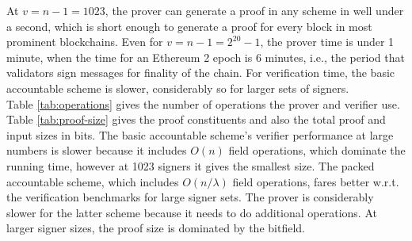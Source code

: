 \noindent At $v = n-1 = 1023$, the prover can generate a proof in any scheme in well under a second, which is short enough to generate a 
proof for every block in most prominent blockchains. Even for $v= n-1 =2^{20}-1$, the prover time is under 1 minute, 
when the time for an Ethereum 2 epoch is 6 minutes, i.e., the period that validators sign messages for finality of the chain. For verification time, 
the basic accountable scheme is slower, considerably so for larger sets of signers. \\

\noindent  Table \ref{tab:operations} gives the number of operations the prover and verifier use. Table \ref{tab:proof-size} gives the proof constituents and 
also the total proof and input sizes in bits. The basic accountable scheme's verifier performance at large numbers is slower because it includes $O(n)$ 
field operations, which dominate the running time, however at 1023 signers it gives the smallest size. The packed accountable scheme, which includes 
$O(n/\lambda)$ field operations, fares better w.r.t. the verification benchmarks for large signer sets. The prover is considerably slower for the latter scheme 
because it needs to do additional operations. At larger signer sizes, the proof size  is dominated by the bitfield.

